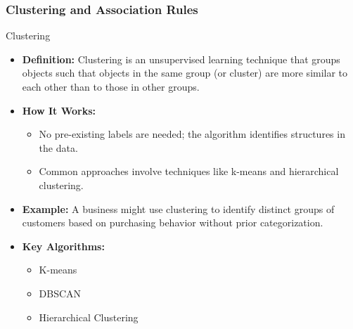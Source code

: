 \documentclass[aspectratio=169]{beamer}
\begin{document}
\begin{frame}[fragile]
    \frametitle{Clustering and Association Rules}
    
    \begin{block}{Clustering}
        \begin{itemize}
            \item \textbf{Definition:} Clustering is an unsupervised learning technique that groups objects such that objects in the same group (or cluster) are more similar to each other than to those in other groups.
            \item \textbf{How It Works:}
            \begin{itemize}
                \item No pre-existing labels are needed; the algorithm identifies structures in the data.
                \item Common approaches involve techniques like k-means and hierarchical clustering.
            \end{itemize}
            \item \textbf{Example:} A business might use clustering to identify distinct groups of customers based on purchasing behavior without prior categorization.
            \item \textbf{Key Algorithms:}
            \begin{itemize}
                \item K-means
                \item DBSCAN
                \item Hierarchical Clustering
            \end{itemize}
        \end{itemize}
    \end{block}
    

\end{frame}
\end{document}
